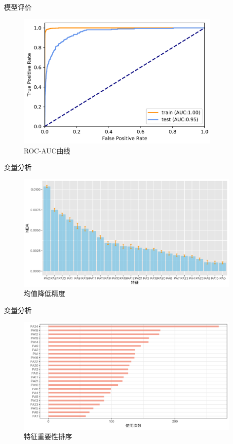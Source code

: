 \begin{frame}[fragile]{模型评价}
    \begin{figure}
        \includegraphics[width=10cm]{Pic/ROC_AUC.png}
        \caption{ROC-AUC曲线}
    \end{figure}
\end{frame}

\begin{frame}[fragile]{变量分析}
    \begin{figure}
        \includegraphics[width=11cm]{Pic/均值降低精度.png}
        \caption{均值降低精度}
    \end{figure}
\end{frame}

\begin{frame}[fragile]{变量分析}
    \begin{figure}
        \includegraphics[width=11cm]{Pic/特征重要性排序.png}
        \caption{特征重要性排序}
    \end{figure}
\end{frame}

